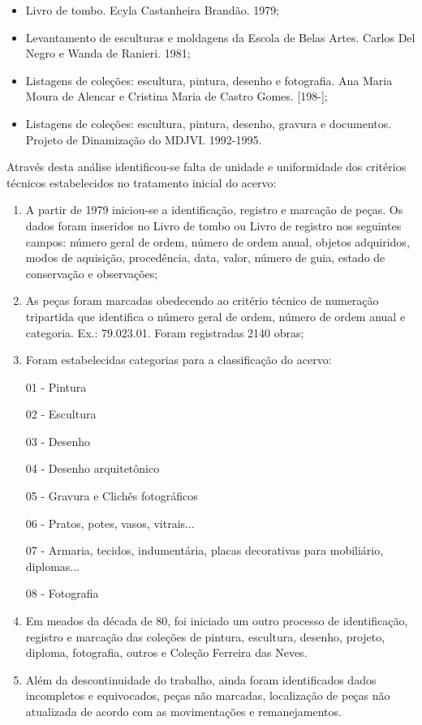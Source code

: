 \begin{itemize}
	\item Livro de tombo. Ecyla Castanheira Brandão. 1979;
	\item Levantamento de esculturas e moldagens da Escola de Belas Artes. Carlos Del Negro e Wanda de Ranieri. 1981;
	\item Listagens de coleções: escultura, pintura, desenho e fotografia. Ana Maria Moura de Alencar e Cristina Maria de Castro Gomes. [198-];
	\item Listagens de coleções: escultura, pintura, desenho, gravura e documentos. Projeto de Dinamização do MDJVI. 1992-1995.
\end{itemize}

Através desta análise identificou-se falta de unidade e uniformidade dos critérios técnicos estabelecidos no tratamento inicial do acervo:

\begin{enumerate}
	\item A partir de 1979 iniciou-se a identificação, registro e marcação de peças. Os dados foram inseridos no Livro de tombo ou Livro de registro nos seguintes campos: número geral de ordem, número de ordem anual, objetos adquiridos, modos de aquisição, procedência, data, valor, número de guia, estado de conservação e observações;
	\item As peças foram marcadas obedecendo ao critério técnico de numeração tripartida que identifica o número geral de ordem, número de ordem anual e categoria. Ex.: 79.023.01. Foram registradas 2140 obras;
	\item Foram estabelecidas categorias para a classificação do acervo:
	
	01 - Pintura
	
	02 - Escultura
	
	03 - Desenho
	
	04 - Desenho arquitetônico
	
	05 - Gravura e Clichês fotográficos
	
	06 - Pratos, potes, vasos, vitrais...
	
	07 - Armaria, tecidos, indumentária, placas decorativas para mobiliário, diplomas...
	
	08 - Fotografia
	
	\item Em meados da década de 80, foi iniciado um outro processo de identificação, registro e marcação das coleções de pintura, escultura, desenho, projeto, diploma, fotografia, outros e Coleção Ferreira das Neves.
	\item Além da descontinuidade do trabalho, ainda foram identificados dados incompletos e equivocados, peças não marcadas, localização de peças não atualizada de acordo com as movimentações e remanejamentos.		
\end{enumerate}

